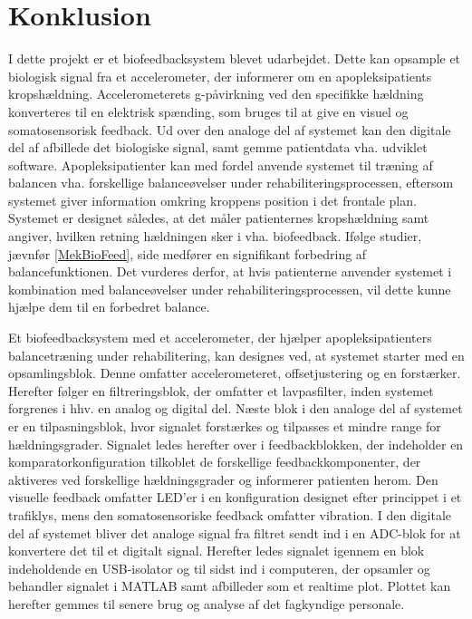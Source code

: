 \section{Konklusion}
I dette projekt er et biofeedbacksystem blevet udarbejdet. Dette kan opsample et biologisk signal fra et accelerometer, der informerer om en apopleksipatients kropshældning. Accelerometerets g-påvirkning ved den specifikke hældning konverteres til en elektrisk spænding, som bruges til at give en visuel og somatosensorisk feedback. Ud over den analoge del af systemet kan den digitale del af afbillede det biologiske signal, samt gemme patientdata vha. udviklet software. Apopleksipatienter kan med fordel anvende systemet til træning af balancen vha. forskellige balanceøvelser under rehabiliteringsprocessen, eftersom systemet giver information omkring kroppens position i det frontale plan. Systemet er designet således, at det måler patienternes kropshældning samt angiver, hvilken retning hældningen sker i vha. biofeedback. Ifølge studier, jævnfør \ref{MekBioFeed}, side \pageref{MekBioFeed} medfører en signifikant forbedring af balancefunktionen. Det vurderes derfor, at hvis patienterne anvender systemet i kombination med balanceøvelser under rehabiliteringsprocessen, vil dette kunne hjælpe dem til en forbedret balance. 

Et biofeedbacksystem med et accelerometer, der hjælper apopleksipatienters balancetræning under rehabilitering, kan designes ved, at systemet starter med en opsamlingsblok. Denne omfatter accelerometeret, offsetjustering og en forstærker. Herefter følger en filtreringsblok, der omfatter et lavpasfilter, inden systemet forgrenes i hhv. en analog og digital del. Næste blok i den analoge del af systemet er en tilpasningsblok, hvor signalet forstærkes og tilpasses et mindre range for hældningsgrader. Signalet ledes herefter over i feedbackblokken, der indeholder en komparatorkonfiguration tilkoblet de forskellige feedbackkomponenter, der aktiveres ved forskellige hældningsgrader og informerer patienten herom. Den visuelle feedback omfatter LED'er i en konfiguration designet efter princippet i et trafiklys, mens den somatosensoriske feedback omfatter vibration. 
I den digitale del af systemet bliver det analoge signal fra filtret sendt ind i en ADC-blok for at konvertere det til et digitalt signal. Herefter ledes signalet igennem en blok indeholdende en USB-isolator og til sidst ind i computeren, der opsamler og behandler signalet i MATLAB samt afbilleder som et realtime plot. Plottet kan herefter gemmes til senere brug og analyse af det fagkyndige personale.

